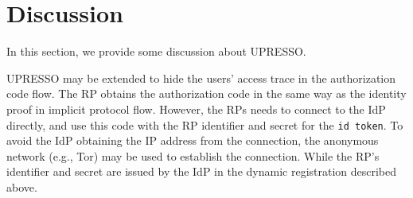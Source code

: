 \section{Discussion}
\label{sec:discussion}
In this section, we provide some discussion about UPRESSO.


 UPRESSO may be extended to hide the users' access trace in  the authorization code flow. The RP obtains the authorization code in the same way as the  identity proof in implicit protocol flow. However, the RPs needs to connect to the IdP directly, and  use this code with  the RP identifier and secret for the \verb+id token+. To avoid the IdP obtaining the IP address from the connection, the anonymous network (e.g., Tor) may be used to establish the connection. While the RP's identifier and secret are issued by the IdP in the dynamic registration described above.


